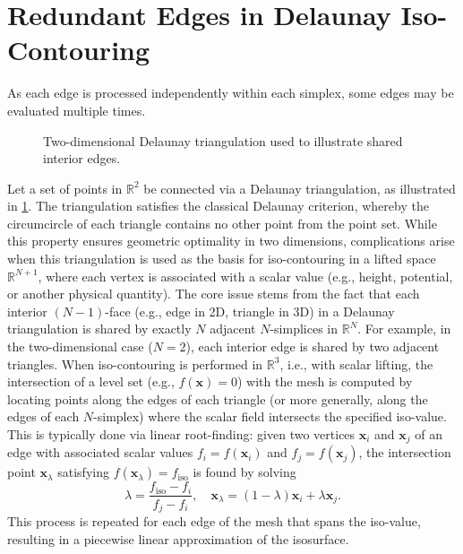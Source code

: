 \section{Redundant Edges in Delaunay Iso-Contouring}
As each edge is processed independently within each simplex, some edges may be evaluated multiple times. 

\begin{figure}[ht]
    \centering
    
    \caption{Two-dimensional Delaunay triangulation used to illustrate shared
    interior edges.}
    \label{fig:2D_Delaunay_Triangulation}
\end{figure}

Let a set of points in $\mathbb{R}^2$ be connected via a Delaunay triangulation, as illustrated in \cref{fig:2D_Delaunay_Triangulation}. The triangulation satisfies the classical Delaunay criterion, whereby the circumcircle of each triangle contains no other point from the point set. While this property ensures geometric optimality in two dimensions, complications arise when this triangulation is used as the basis for iso-contouring in a lifted space $\mathbb{R}^{N+1}$, where each vertex is associated with a scalar value (e.g., height, potential, or another physical quantity).
The core issue stems from the fact that each interior $(N-1)$-face (e.g., edge in 2D, triangle in 3D) in a Delaunay triangulation is shared by exactly $N$ adjacent $N$-simplices in $\mathbb{R}^N$. For example, in the two-dimensional case ($N = 2$), each interior edge is shared by two adjacent triangles. When iso-contouring is performed in $\mathbb{R}^3$, i.e., with scalar lifting, the intersection of a level set (e.g., $f(\mathbf{x}) = 0$) with the mesh is computed by locating points along the edges of each triangle (or more generally, along the edges of each $N$-simplex) where the scalar field intersects the specified iso-value. This is typically done via linear root-finding: given two vertices $\mathbf{x}_i$ and $\mathbf{x}_j$ of an edge with associated scalar values $f_i = f(\mathbf{x}_i)$ and $f_j = f(\mathbf{x}_j)$, the intersection point $\mathbf{x}_\lambda$ satisfying $f(\mathbf{x}_\lambda) = f_{\text{iso}}$ is found by solving
%
\begin{equation}
    \lambda = \frac{f_{\text{iso}} - f_i}{f_j - f_i}, \quad \mathbf{x}_\lambda = (1 - \lambda)\mathbf{x}_i + \lambda \mathbf{x}_j.
\end{equation}
%
This process is repeated for each edge of the mesh that spans the iso-value, resulting in a piecewise linear approximation of the isosurface.

